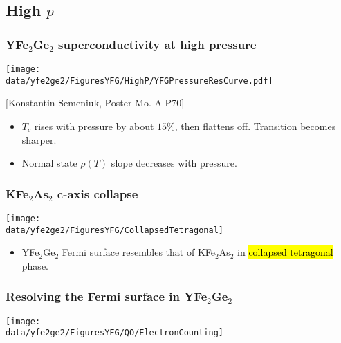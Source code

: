 \subsection{High $p$}
\begin{frame}[label=YFGHighP]
\frametitle{YFe$_2$Ge$_2$ superconductivity at high pressure}
\centerline{\texttt{[image: \\data/yfe2ge2/FiguresYFG/HighP/YFGPressureResCurve.pdf]}}

\centerline{\small[Konstantin Semeniuk, Poster Mo. A-P70]}

\begin{itemize}
\item 
$T_c$ rises with pressure by about $15 \%$, then flattens
off. Transition becomes sharper.

\item
Normal state $\rho(T)$ slope decreases with pressure.

\end{itemize}

\end{frame}


\begin{frame}[label=CollapsedTetragonal1]
\frametitle{KFe$_2$As$_2$ c-axis collapse}

\centerline{\texttt{[image: \\data/yfe2ge2/FiguresYFG/CollapsedTetragonal]}}

\begin{itemize}
\item
YFe$_2$Ge$_2$ Fermi surface resembles that of
  KFe$_2$As$_2$ in \hl{collapsed tetragonal} phase.
\end{itemize}

\end{frame}

\begin{frame}[plain,label=YFGCounting]
\frametitle{Resolving the Fermi surface in YFe$_2$Ge$_2$}
\texttt{[image: \\data/yfe2ge2/FiguresYFG/QO/ElectronCounting]}
\end{frame}

